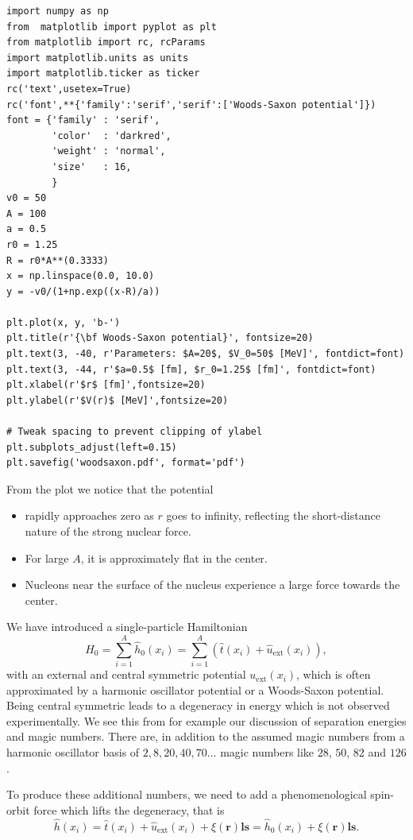 \documentclass[%
twoside,                 %
final,                   %
10pt]{article}
\begin{document}
\begin{verbatim}
import numpy as np
from  matplotlib import pyplot as plt
from matplotlib import rc, rcParams
import matplotlib.units as units
import matplotlib.ticker as ticker
rc('text',usetex=True)
rc('font',**{'family':'serif','serif':['Woods-Saxon potential']})
font = {'family' : 'serif',
        'color'  : 'darkred',
        'weight' : 'normal',
        'size'   : 16,
        }
v0 = 50
A = 100
a = 0.5
r0 = 1.25
R = r0*A**(0.3333)
x = np.linspace(0.0, 10.0)
y = -v0/(1+np.exp((x-R)/a))

plt.plot(x, y, 'b-')
plt.title(r'{\bf Woods-Saxon potential}', fontsize=20)     
plt.text(3, -40, r'Parameters: $A=20$, $V_0=50$ [MeV]', fontdict=font)
plt.text(3, -44, r'$a=0.5$ [fm], $r_0=1.25$ [fm]', fontdict=font)
plt.xlabel(r'$r$ [fm]',fontsize=20)
plt.ylabel(r'$V(r)$ [MeV]',fontsize=20)

# Tweak spacing to prevent clipping of ylabel
plt.subplots_adjust(left=0.15)
plt.savefig('woodsaxon.pdf', format='pdf')
\end{verbatim}
From the plot we notice that the potential
\begin{itemize}
\item rapidly approaches zero as $r$ goes to infinity, reflecting the short-distance nature of the strong nuclear force.

\item For large $A$, it is approximately flat in the center.

\item Nucleons near the surface of the nucleus experience a large force towards the center.
\end{itemize}

\noindent
We have introduced a single-particle Hamiltonian
\[
  H_0=\sum_{i=1}^A \hat{h}_0(x_i) =  \sum_{i=1}^A\left(\hat{t}(x_i) + \hat{u}_{\mathrm{ext}}(x_i)\right),
\]
with an external and central symmetric potential $u_{\mathrm{ext}}(x_i)$, which is often 
approximated by a harmonic oscillator potential or a Woods-Saxon potential. Being central symmetric leads to a degeneracy 
in energy which is not observed experimentally. We see this from for example our discussion of separation energies and magic numbers. There are, in addition to the assumed magic numbers from a harmonic oscillator basis of $2,8,20,40,70\dots$ magic numbers like $28$, $50$, $82$ and $126$. 

To produce these additional numbers, we need to add a phenomenological spin-orbit force which lifts the degeneracy, that is
\[
\hat{h}(x_i) =  \hat{t}(x_i) + \hat{u}_{\mathrm{ext}}(x_i) +\xi(\bm{r})\bm{ls}=\hat{h}_0(x_i)+\xi(\bm{r})\bm{ls}. 
\]
\end{document}
